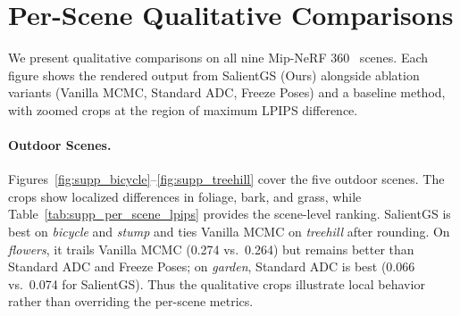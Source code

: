 \documentclass[sigconf]{acmart}
\begin{document}
\begin{table}[t]
    \centering
    \footnotesize
    \setlength\tabcolsep{2pt}
    \caption{
        \textbf{SfM runtime comparison (seconds).} We compare the SfM component runtime across different methods on the Courthouse scene with varying numbers of input images. SalientGS combines Fisher Vector retrieval with first-order SfM optimization to achieve significant speedups over traditional and learning-based approaches.
    }
    \label{tab:supp_sfm_runtime}
\end{table}

\section{Per-Scene Qualitative Comparisons}
\label{sec:supp_qualitative}

We present qualitative comparisons on all nine Mip-NeRF 360~\cite{barron2022mip} scenes.
Each figure shows the rendered output from SalientGS (Ours) alongside ablation variants (Vanilla MCMC, Standard ADC, Freeze Poses) and a baseline method, with zoomed crops at the region of maximum LPIPS difference.

\paragraph{Outdoor Scenes.}
Figures~\ref{fig:supp_bicycle}--\ref{fig:supp_treehill} cover the five outdoor scenes.
The crops show localized differences in foliage, bark, and grass, while Table~\ref{tab:supp_per_scene_lpips} provides the scene-level ranking. SalientGS is best on \textit{bicycle} and \textit{stump} and ties Vanilla MCMC on \textit{treehill} after rounding. On \textit{flowers}, it trails Vanilla MCMC (0.274 vs.\ 0.264) but remains better than Standard ADC and Freeze Poses; on \textit{garden}, Standard ADC is best (0.066 vs.\ 0.074 for SalientGS). Thus the qualitative crops illustrate local behavior rather than overriding the per-scene metrics.
\end{document}
